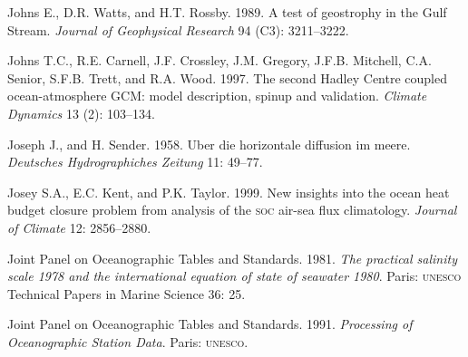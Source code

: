 \begin{thebibliography}{999}
Johns E., D.R. Watts, and H.T. Rossby.  1989. A test of
  geostrophy in the Gulf Stream. \textit{Journal of Geophysical
    Research} 94 (C3): 3211--3222.
%

Johns T.C., R.E. Carnell, J.F. Crossley, J.M. Gregory,
J.F.B. Mitchell, C.A. Senior, S.F.B. Trett, and R.A. Wood. 1997. The
second Hadley Centre coupled ocean-atmosphere GCM: model description,
spinup and validation. \textit{Climate Dynamics} 13 (2): 103--134.
%

Joseph J., and H. Sender.  1958. Uber die horizontale diffusion im
meere.  \textit{Deutsches Hydrographiches Zeitung} 11: 49--77.
%

Josey S.A., E.C. Kent, and P.K. Taylor.  1999. New insights into the
ocean heat budget closure problem from analysis of the \textsc{soc}
air-sea flux climatology. \textit{Journal of Climate} 12: 2856--2880.
%

Joint Panel on Oceanographic Tables and Standards. 1981. \textit{The
  practical salinity scale 1978 and the international equation of
  state of seawater 1980}. Paris: \textsc{unesco} Technical Papers in
Marine Science 36: 25.
%

Joint Panel on Oceanographic Tables and
Standards. 1991. \textit{Processing of Oceanographic Station
  Data}. Paris: \textsc{unesco}.
%


\end{thebibliography}
